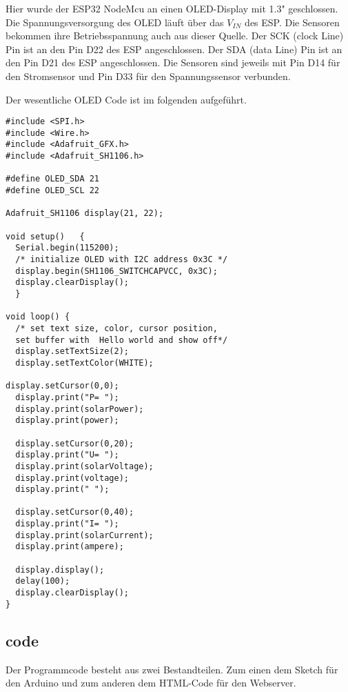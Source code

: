 \documentclass[ngerman]{mucproc}
\newenvironment{minted}[2][]{\endgraf\verbatim}{\endverbatim}
\begin{document}
Hier wurde der ESP32 NodeMcu an einen OLED-Display mit 1.3" geschlossen. Die Spannungsversorgung des OLED läuft über das $V_{IN}$ des ESP. Die Sensoren bekommen ihre Betriebsspannung auch aus dieser Quelle. Der SCK (clock Line) Pin\parencite{SPI.2021} ist an den Pin D22 des ESP angeschlossen. Der SDA (data Line) Pin\parencite{Wire.2021} ist an den Pin D21 des ESP angeschlossen. Die Sensoren sind jeweils mit Pin D14 für den Stromsensor und Pin D33 für den Spannungssensor verbunden.

Der wesentliche OLED Code ist im folgenden aufgeführt.

\begin{verbatim}
#include <SPI.h>
#include <Wire.h>
#include <Adafruit_GFX.h>
#include <Adafruit_SH1106.h>

#define OLED_SDA 21
#define OLED_SCL 22

Adafruit_SH1106 display(21, 22);

void setup()   {                
  Serial.begin(115200);
  /* initialize OLED with I2C address 0x3C */
  display.begin(SH1106_SWITCHCAPVCC, 0x3C); 
  display.clearDisplay();
  }

void loop() { 
  /* set text size, color, cursor position, 
  set buffer with  Hello world and show off*/
  display.setTextSize(2);
  display.setTextColor(WHITE);

display.setCursor(0,0);
  display.print("P= ");
  display.print(solarPower);
  display.print(power);
  
  display.setCursor(0,20);
  display.print("U= ");
  display.print(solarVoltage);
  display.print(voltage);
  display.print(" ");
  
  display.setCursor(0,40);
  display.print("I= ");
  display.print(solarCurrent);
  display.print(ampere);

  display.display();
  delay(100);
  display.clearDisplay();
}

\end{verbatim}
\newpage


\subsection{code}

Der Programmcode besteht aus zwei Bestandteilen. Zum einen dem Sketch für den Arduino und zum anderen dem HTML-Code für den Webserver.
\end{document}

